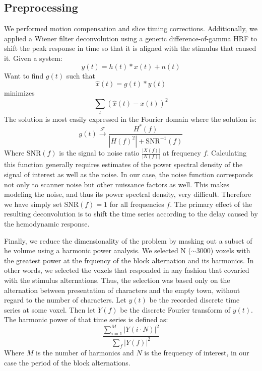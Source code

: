 \documentclass[twocolumn,final]{article}
\begin{document}
\subsection{Preprocessing}
We performed motion compensation and slice timing corrections. 
Additionally, we applied a Wiener filter deconvolution using a generic difference-of-gamma HRF \cite{Boynton1996} to shift the peak response in time so that it is aligned with the stimulus that caused it.
Given a system:
\begin{equation}
y(t) = h(t) \ast x(t) + n(t)
\end{equation}
Want to find $g(t)$ such that 
\begin{equation}
\hat{x}(t) = g(t) \ast y(t)
\end{equation}
minimizes
\begin{equation}
\sum_{t}{\left( \hat{x}(t) - x(t) \right)^{2}}
\end{equation}
The solution is most easily expressed in the Fourier domain where the solution is:
\begin{equation}
g(t) \xrightarrow{\mathcal{F}} \frac{H^{*}(f)}{\left|H(f)^{2}\right| + \mbox{SNR}^{-1}(f)}
\end{equation}
Where $\mbox{SNR}(f)$ is the signal to noise ratio $\frac{\left| X(f) \right|}{\left| N(f) \right|}$ at frequency $f$.
Calculating this function generally requires estimates of the power spectral density of the signal of interest as well as the noise.
In our case, the noise function corresponds not only to scanner noise but other nuissance factors as well.
This makes modeling the noise, and thus its power spectral density, very difficult.
Therefore we have simply set $\mbox{SNR}(f) = 1$ for all frequencies $f$.
The primary effect of the resulting deconvolution is to shift the time series according to the delay caused by the hemodynamic response.

Finally, we reduce the dimensionality of the problem by masking out a subset of he volume using a harmonic power analysis.
We selected N ($\sim$3000) voxels with the greatest power at the frquency of the block alternation and its harmonics.
In other words, we selected the voxels that responded in any fashion that covaried with the stimulus alternations.
Thus, the selection was based only on the alternation between presentation of characters and the empty town, without regard to the number of characters.
Let $y(t)$ be the recorded discrete time series at some voxel.
Then let $Y(f)$ be the discrete Fourier transform of $y(t)$.
The harmonic power of that time series is defined as:
\begin{equation}
\frac{\sum_{i = 1}^{M}{\left|Y(i \cdot N)\right|^{2}}}{\sum_{f}{\left|Y(f)\right|^{2}}}
\end{equation}
Where $M$ is the number of harmonics and $N$ is the frequency of interest, in our case the period of the block alternations.
\end{document}
